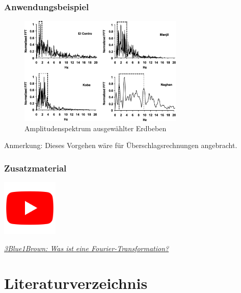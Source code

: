 \documentclass[hyperref={pdfpagemode=FullScreen, colorlinks=false}]{beamer}
\begin{document}
\begin{frame}
\frametitle{Anwendungsbeispiel}
\begin{figure}
 \includegraphics[width=0.7\textwidth]{fig_img/earthquake_spectra.jpg}
 \caption*{Amplitudenspektrum ausgewählter Erdbeben \cite{amiri2008}}
\end{figure}
Anmerkung: Dieses Vorgehen wäre für Überschlagsrechnungen angebracht.

\end{frame}



\begin{frame}
\frametitle{Zusatzmaterial} %
\vfill
\begin{center}
\includegraphics[width=0.2\textwidth]{fig_img/youtube.png}  

\href{https://www.youtube.com/watch?v=spUNpyF58BY}{\textsl{3Blue1Brown: Was ist eine Fourier-Transformation?}}
\end{center}  
\vfill
\end{frame}



\section*{Literaturverzeichnis}

\begin{frame}[allowframebreaks]{}
	\printbibliography
\end{frame}
\end{document}
